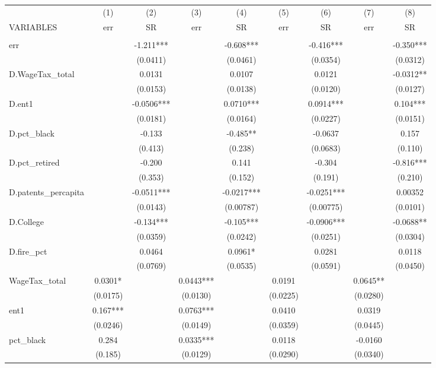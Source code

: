 \begin{tabular}{lcccccccc} \hline
 & (1) & (2) & (3) & (4) & (5) & (6) & (7) & (8) \\
VARIABLES & err & SR & err & SR & err & SR & err & SR \\ \hline
 &  &  &  &  &  &  &  &  \\
err &  & -1.211*** &  & -0.608*** &  & -0.416*** &  & -0.350*** \\
 &  & (0.0411) &  & (0.0461) &  & (0.0354) &  & (0.0312) \\
D.WageTax\_total &  & 0.0131 &  & 0.0107 &  & 0.0121 &  & -0.0312** \\
 &  & (0.0153) &  & (0.0138) &  & (0.0120) &  & (0.0127) \\
D.ent1 &  & -0.0506*** &  & 0.0710*** &  & 0.0914*** &  & 0.104*** \\
 &  & (0.0181) &  & (0.0164) &  & (0.0227) &  & (0.0151) \\
D.pct\_black &  & -0.133 &  & -0.485** &  & -0.0637 &  & 0.157 \\
 &  & (0.413) &  & (0.238) &  & (0.0683) &  & (0.110) \\
D.pct\_retired &  & -0.200 &  & 0.141 &  & -0.304 &  & -0.816*** \\
 &  & (0.353) &  & (0.152) &  & (0.191) &  & (0.210) \\
D.patents\_percapita &  & -0.0511*** &  & -0.0217*** &  & -0.0251*** &  & 0.00352 \\
 &  & (0.0143) &  & (0.00787) &  & (0.00775) &  & (0.0101) \\
D.College &  & -0.134*** &  & -0.105*** &  & -0.0906*** &  & -0.0688** \\
 &  & (0.0359) &  & (0.0242) &  & (0.0251) &  & (0.0304) \\
D.fire\_pct &  & 0.0464 &  & 0.0961* &  & 0.0281 &  & 0.0118 \\
 &  & (0.0769) &  & (0.0535) &  & (0.0591) &  & (0.0450) \\
WageTax\_total & 0.0301* &  & 0.0443*** &  & 0.0191 &  & 0.0645** &  \\
 & (0.0175) &  & (0.0130) &  & (0.0225) &  & (0.0280) &  \\
ent1 & 0.167*** &  & 0.0763*** &  & 0.0410 &  & 0.0319 &  \\
 & (0.0246) &  & (0.0149) &  & (0.0359) &  & (0.0445) &  \\
pct\_black & 0.284 &  & 0.0335*** &  & 0.0118 &  & -0.0160 &  \\
 & (0.185) &  & (0.0129) &  & (0.0290) &  & (0.0340) &  \\

\end{tabular}
